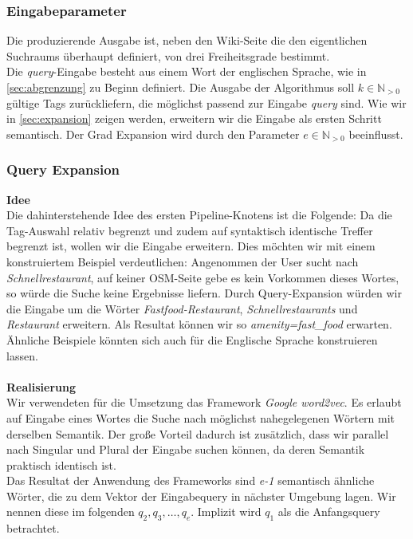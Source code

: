 \documentclass[12pt,pdftex,a4paper]{article}
\begin{document}
\subsubsection{Eingabeparameter}
Die produzierende Ausgabe ist, neben den Wiki-Seite die den eigentlichen Suchraums überhaupt definiert, von drei Freiheitsgrade bestimmt. \\
Die \textit{query}-Eingabe besteht aus einem Wort der englischen Sprache, wie in  \autoref{sec:abgrenzung} zu Beginn definiert.
Die Ausgabe der Algorithmus soll $k \in \mathbb{N}_{>0}$ gültige Tags zurückliefern, die möglichst passend zur Eingabe \textit{query} sind. 
Wie wir in \autoref{sec:expansion} zeigen werden, erweitern wir die Eingabe als ersten Schritt semantisch. Der Grad Expansion wird durch den Parameter $e \in \mathbb{N}_{>0}$ beeinflusst.


\subsubsection{Query Expansion}\label{sec:expansion}
\textbf{Idee}\\
Die dahinterstehende Idee des ersten Pipeline-Knotens ist die Folgende: Da die Tag-Auswahl relativ begrenzt und zudem auf syntaktisch identische Treffer begrenzt ist, wollen wir die Eingabe erweitern. Dies möchten wir mit einem konstruiertem Beispiel verdeutlichen: Angenommen der User sucht nach \textit{Schnellrestaurant}, auf keiner OSM-Seite gebe es kein Vorkommen dieses Wortes, so würde die Suche keine Ergebnisse liefern. Durch Query-Expansion würden wir die Eingabe um die Wörter \textit{Fastfood-Restaurant}, \textit{Schnellrestaurants} und \textit{Restaurant} erweitern. Als Resultat können wir so \textit{amenity=fast\_food} erwarten. Ähnliche Beispiele könnten sich auch für die Englische Sprache konstruieren lassen.\\
\textit{}\\
\textbf{Realisierung}\\
Wir verwendeten für die Umsetzung das Framework \textit{Google word2vec}\cite{googleword2vec}. Es erlaubt auf Eingabe eines Wortes die Suche nach möglichst nahegelegenen Wörtern mit derselben Semantik. Der große Vorteil dadurch ist zusätzlich, dass wir parallel nach Singular und Plural der Eingabe suchen können, da deren Semantik praktisch identisch ist.\\
Das Resultat der Anwendung des Frameworks sind \textit{e-1} semantisch ähnliche Wörter, die zu dem Vektor der Eingabequery in nächster Umgebung lagen. Wir nennen diese im folgenden $q_2, q_3, \dots, q_e$. Implizit wird $q_1$ als die Anfangsquery betrachtet.
\end{document}
